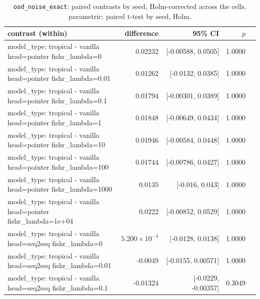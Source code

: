 \documentclass[10pt]{article}
\makeatletter
\newcommand{\stackcell}[1]{\begin{tabular}[t]{@{}l@{}}#1\end{tabular}}
\makeatother
\begin{document}
{\small
\begin{longtable}{lrrrl}
\caption{\texttt{ood\_noise\_exact}: paired contrasts by seed, Holm-corrected across the cells. parametric: paired t-test by seed, Holm.}\label{tab:paired-ood_noise_exact}\\
\toprule
contrast (within) & difference & 95\% CI & $p$ & \\
\midrule
\endhead
\stackcell{model\_type: tropical - vanilla\\\footnotesize head=pointer fishr\_lambda=0 } & 0.02232 & [-0.00588, 0.0505] & 1.0000 & \\
\stackcell{model\_type: tropical - vanilla\\\footnotesize head=pointer fishr\_lambda=0.01 } & 0.01262 & [-0.0132, 0.0385] & 1.0000 & \\
\stackcell{model\_type: tropical - vanilla\\\footnotesize head=pointer fishr\_lambda=0.1 } & 0.01794 & [-0.00301, 0.0389] & 1.0000 & \\
\stackcell{model\_type: tropical - vanilla\\\footnotesize head=pointer fishr\_lambda=1 } & 0.01848 & [-0.00649, 0.0434] & 1.0000 & \\
\stackcell{model\_type: tropical - vanilla\\\footnotesize head=pointer fishr\_lambda=10 } & 0.01946 & [-0.00584, 0.0448] & 1.0000 & \\
\stackcell{model\_type: tropical - vanilla\\\footnotesize head=pointer fishr\_lambda=100 } & 0.01744 & [-0.00786, 0.0427] & 1.0000 & \\
\stackcell{model\_type: tropical - vanilla\\\footnotesize head=pointer fishr\_lambda=1000 } & 0.0135 & [-0.016, 0.043] & 1.0000 & \\
\stackcell{model\_type: tropical - vanilla\\\footnotesize head=pointer fishr\_lambda=1e+04 } & 0.0222 & [-0.00852, 0.0529] & 1.0000 & \\
\stackcell{model\_type: tropical - vanilla\\\footnotesize head=seq2seq fishr\_lambda=0 } & $5.200\times10^{-4}$ & [-0.0128, 0.0138] & 1.0000 & \\
\stackcell{model\_type: tropical - vanilla\\\footnotesize head=seq2seq fishr\_lambda=0.01 } & -0.0049 & [-0.0155, 0.00571] & 1.0000 & \\
\stackcell{model\_type: tropical - vanilla\\\footnotesize head=seq2seq fishr\_lambda=0.1 } & -0.01324 & [-0.0229, -0.00357] & 0.3049 & \\

\end{longtable}}
\end{document}
